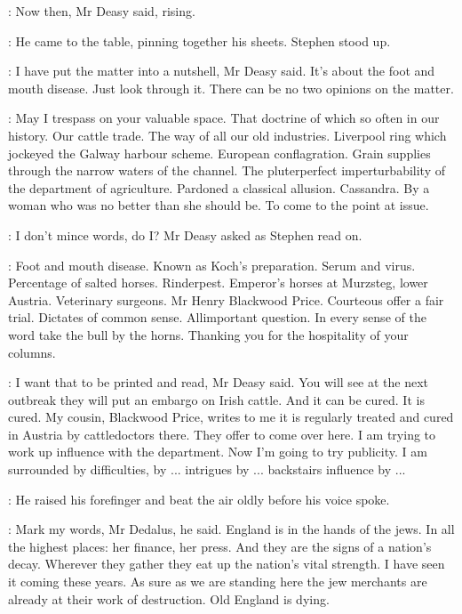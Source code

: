 \deasy:
Now then, Mr Deasy said, rising.

:
He came to the table, pinning together his sheets. Stephen stood up.

\deasy:
I have put the matter into a nutshell, Mr Deasy said. It's about the
foot and mouth disease. Just look through it. There can be no two opinions
on the matter.

\StephenInt: 
May I trespass on your valuable space. That doctrine of 
which so often in our history. Our cattle trade. The way of all our old
industries. Liverpool ring which jockeyed the Galway harbour scheme.
European conflagration. Grain supplies through the narrow waters of the
channel. The pluterperfect imperturbability of the department of
agriculture. Pardoned a classical allusion. Cassandra. By a woman who
was no better than she should be. To come to the point at issue.

\deasy:
I don't mince words, do I? Mr Deasy asked as Stephen read on.

\StephenInt: 
Foot and mouth disease. Known as Koch's preparation. Serum and
virus. Percentage of salted horses. Rinderpest. Emperor's horses at
Murzsteg, lower Austria. Veterinary surgeons. Mr Henry Blackwood Price.
Courteous offer a fair trial. Dictates of common sense. Allimportant
question. In every sense of the word take the bull by the horns. Thanking
you for the hospitality of your columns.

\deasy:
I want that to be printed and read, Mr Deasy said. You will see at the
next outbreak they will put an embargo on Irish cattle. And it can be
cured. It is cured. My cousin, Blackwood Price, writes to me it is
regularly treated and cured in Austria by cattledoctors there. They offer
to come over here. I am trying to work up influence with the department.
Now I'm going to try publicity. I am surrounded by difficulties,
by ... intrigues by ... backstairs influence by ...

:
He raised his forefinger and beat the air oldly before his voice spoke.

\deasy:
Mark my words, Mr Dedalus, he said. England is in the hands of the
jews. In all the highest places: her finance, her press. And they are the
signs of a nation's decay. Wherever they gather they eat up the nation's
vital strength. I have seen it coming these years. As sure as we are
standing here the jew merchants are already at their work of destruction.
Old England is dying.


